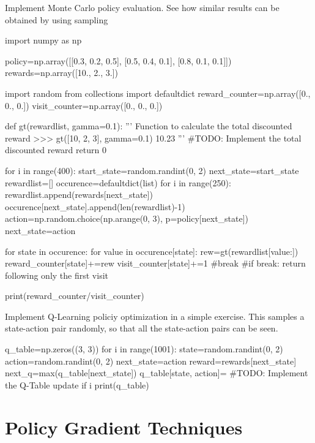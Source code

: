 \begin{exercise}
Implement Monte Carlo policy evaluation. See how similar results can be
obtained by using sampling
\begin{python}
import numpy as np

policy=np.array([[0.3, 0.2, 0.5], [0.5, 0.4, 0.1], [0.8, 0.1, 0.1]])
rewards=np.array([10., 2., 3.])

import random
from collections import defaultdict
reward_counter=np.array([0., 0., 0.])
visit_counter=np.array([0., 0., 0.])

def gt(rewardlist, gamma=0.1):
    '''
    Function to calculate the total discounted reward
    >>> gt([10, 2, 3], gamma=0.1)
    10.23
    '''
    #TODO: Implement the total discounted reward
    return 0

for i in range(400):
    start_state=random.randint(0, 2)
    next_state=start_state
    rewardlist=[]
    occurence=defaultdict(list) 
    for i in range(250):
        rewardlist.append(rewards[next_state]) 
        occurence[next_state].append(len(rewardlist)-1) 
        action=np.random.choice(np.arange(0, 3), p=policy[next_state]) 
        next_state=action

    for state in occurence: 
        for value in occurence[state]: 
            rew=gt(rewardlist[value:]) 
            reward_counter[state]+=rew 
            visit_counter[state]+=1 
            #break #if break: return following only the first visit

print(reward_counter/visit_counter)
\end{python}

Implement Q-Learning policiy optimization in a simple exercise. This samples a state-action pair randomly, so that all the state-action pairs can be seen.
\begin{python}
q_table=np.zeros((3, 3)) 
for i in range(1001): 
    state=random.randint(0, 2) 
    action=random.randint(0, 2) 
    next_state=action
    reward=rewards[next_state] 
    next_q=max(q_table[next_state])
    q_table[state, action]= #TODO: Implement the Q-Table update
    if i%
        print(q_table)
\end{python}
\end{exercise}


\section{Policy Gradient Techniques}

